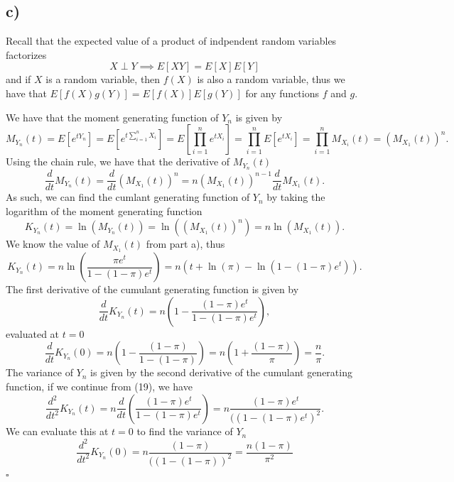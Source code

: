 \documentclass{article}
\theoremstyle{definition}
\theoremstyle{remark}
\begin{document}
\subsection*{c)}
Recall that the expected value of a product of indpendent random variables factorizes
$$X \perp Y \implies E[XY] = E[X]E[Y]$$
and if $X$ is a random variable, then $f(X)$ is also a random variable, thus we have that $E[f(X)g(Y)] = E[f(X)]E[g(Y)]$ for any functions $f$ and $g$. \vspace{1em}

We have that the moment generating function of $Y_n$ is given by
\begin{equation}
    M_{Y_n}(t) = E[e^{tY_n}] = E[e^{t\sum_{i=1}^{n} X_i}] = E[\prod_{i=1}^{n} e^{tX_i}] = \prod_{i=1}^{n} E[e^{tX_i}] = \prod_{i=1}^{n} M_{X_i}(t) = (M_{X_1}(t))^n.
\end{equation}
Using the chain rule, we have that the derivative of $M_{Y_n}(t)$ 
\begin{equation}
    \dfrac{d}{dt}M_{Y_n}(t) = \dfrac{d}{dt}(M_{X_1}(t))^n = n(M_{X_1}(t))^{n-1} \dfrac{d}{dt}M_{X_1}(t).
\end{equation}
As such, we can find the cumlant generating function of $Y_n$ by taking the logarithm of the moment generating function
\begin{equation}
    K_{Y_n}(t) = \ln(M_{Y_n}(t)) = \ln((M_{X_1}(t))^n) = n\ln(M_{X_1}(t)).
\end{equation}
We know the value of $M_{X_1}(t)$ from part a), thus
\begin{equation}
    K_{Y_n}(t) = n\ln\left(\dfrac{\pi e^t}{1 - (1 - \pi)e^t}\right) = n\left(t + \ln(\pi) - \ln(1 - (1 - \pi)e^t)\right).
\end{equation}
The first derivative of the cumulant generating function is given by
\begin{equation}
    \dfrac{d}{dt}K_{Y_n}(t) = n\left(1 - \dfrac{(1 - \pi)e^t}{1 - (1 - \pi)e^t}\right),
\end{equation}
evaluated at $t=0$
\begin{equation}
    \dfrac{d}{dt}K_{Y_n}(0) = n\left(1 - \dfrac{(1 - \pi)}{1 - (1 - \pi)}\right) = n\left(1 + \dfrac{(1 - \pi)}{\pi}\right) = \dfrac{n}{\pi}.
\end{equation}
The variance of $Y_n$ is given by the second derivative of the cumulant generating function, if we continue from (19), we have
\begin{equation}
    \dfrac{d^2}{dt^2}K_{Y_n}(t) = n\dfrac{d}{dt}\left(\dfrac{(1 - \pi)e^t}{1 - (1 - \pi)e^t}\right) = n\dfrac{(1 - \pi)e^t}{((1 - (1 - \pi)e^t)^2}.
\end{equation}
We can evaluate this at $t=0$ to find the variance of $Y_n$
\begin{equation}
    \dfrac{d^2}{dt^2}K_{Y_n}(0) = n\dfrac{(1 - \pi)}{((1 - (1 - \pi))^2} =\dfrac{n(1 - \pi)}{\pi^2}
\end{equation}
$\square$
\end{document}
